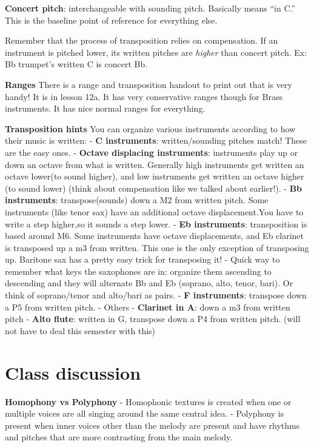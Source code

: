 \documentclass{book}
\begin{document}
\textbf{Concert pitch}: interchangeable with sounding pitch. Basically means
``in C.'' This is the baseline point of reference for everything else.

Remember that the process of transposition relies on compensation. If an
instrument is pitched lower, its written pitches are \emph{higher} than
concert pitch. Ex: Bb trumpet's written C is concert Bb.

\textbf{Ranges} There is a range and transposition handout to print out that
is very handy! It is in lesson 12a. It has very conservative ranges though for
Brass instruments. It has nice normal ranges for everything.

\textbf{Transposition hints} You can organize various instruments according to
how their music is written: - \textbf{C instruments}: written/sounding pitches
match! These are the easy ones. - \textbf{Octave displacing instruments}:
instruments play up or down an octave from what is written. Generally high
instruments get written an octave lower(to sound higher), and low instruments
get written an octave higher (to sound lower) (think about compensation like
we talked about earlier!). - \textbf{Bb instruments}: transpose(sounds) down a
M2 from written pitch. Some instruments (like tenor sax) have an additional
octave displacement.You have to write a step higher,so it sounds a step lower.
- \textbf{Eb instruments}: transposition is based around M6. Some instruments
have octave displacements, and Eb clarinet is transposed up a m3 from written.
This one is the only exception of transposing up. Baritone sax has a pretty
easy trick for transposing it! - Quick way to remember what keys the
saxophones are in: organize them ascending to descending and they will
alternate Bb and Eb (soprano, alto, tenor, bari). Or think of soprano/tenor
and alto/bari as pairs. - \textbf{F instruments}: transpose down a P5 from
written pitch. - Others - \textbf{Clarinet in A}: down a m3 from written pitch
- \textbf{Alto flute}: written in G, transpose down a P4 from written pitch.
(will not have to deal this semester with this)

\hypertarget{class-discussion-5}{%
\chapter{Class discussion}\label{class-discussion-5}}

\textbf{Homophony vs Polyphony} - Homophonic textures is created when one or
multiple voices are all singing around the same central idea. - Polyphony is
present when inner voices other than the melody are present and have rhythms
and pitches that are more contrasting from the main melody.
\end{document}
